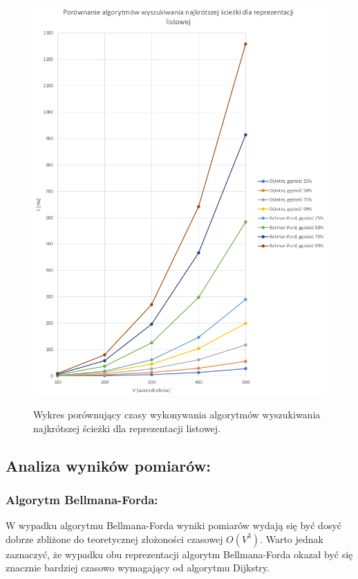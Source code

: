 \documentclass[a4paper,12pt]{article}
\begin{document}
\begin{figure}[H]
	\centering
	\caption{\centering Wykres porównujący czasy wykonywania algorytmów wyszukiwania najkrótszej ścieżki dla reprezentacji listowej.}
	\includegraphics[width=14cm]{fig3.png}
	\label{fig.wykres-lista-shortpath}
\end{figure}

\subsection{Analiza wyników pomiarów:}

\subsubsection{Algorytm Bellmana-Forda:}
W wypadku algorytmu Bellmana-Forda wyniki pomiarów wydają się być dosyć dobrze zbliżone do teoretycznej złożoności czasowej $O(V^3)$. Warto jednak zaznaczyć, że wypadku obu reprezentacji algorytm Bellmana-Forda okazał być się znacznie bardziej czasowo wymagający od algorytmu Dijkstry.
\end{document}

